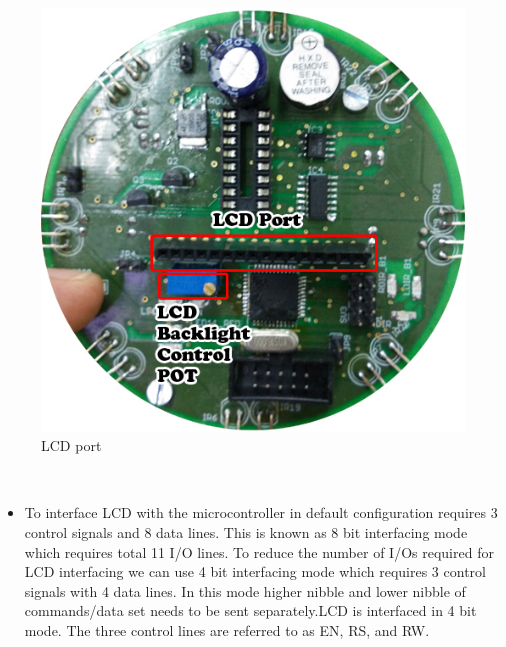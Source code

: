 \documentclass[a4paper,12pt,oneside]{book}
\begin{document}
	\hfill\\
	\begin{figure}[h!]
		\includegraphics[width=\textwidth]{./HardwareManual/lcd1.jpg}
		\caption{LCD port}
	\end{figure}	
	\hfill\\
	
	\begin{itemize}
	\item {
	To interface LCD with the microcontroller in default configuration requires 3 control signals and
	8 data lines. This is known as 8 bit interfacing mode which requires total 11 I/O lines. To reduce
	the number of I/Os required for LCD interfacing we can use 4 bit interfacing mode which
	requires 3 control signals with 4 data lines. In this mode higher nibble and lower nibble of
	commands/data set needs to be sent separately.LCD is interfaced in 4 bit
	mode. The three control lines are referred to as EN, RS, and RW.
	}
	\end{itemize}
\end{document}
